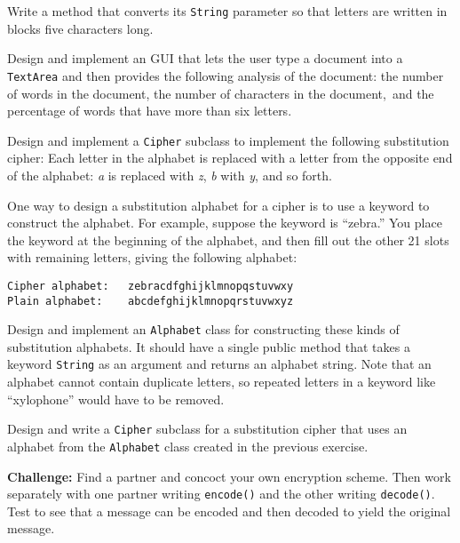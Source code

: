 \begin{EXRtwo}
\noindent Write a method that converts its {\tt String}
parameter so that letters are written in blocks five characters long.

\item  Design and implement an GUI that lets the user type a document
into a {\tt TextArea} and then provides the following analysis of the
document: the number of words in the document, the number of
characters in the document,~and the percentage of words that have more
than six letters.

\item  Design and implement a {\tt Cipher} subclass to
implement the following substitution cipher: Each letter in the alphabet
is replaced with a letter from the opposite end of the alphabet:
{\it a} is replaced with {\it z}, {\it b} with {\it y}, and so forth.

\item  One way to design a substitution alphabet for a cipher
is to use a keyword to construct the alphabet.  For example,
suppose the keyword is ``zebra.'' You place the keyword
at the beginning of the alphabet, and then fill out the
other 21 slots with remaining letters, giving the following
alphabet:

\begin{jjjlisting}
\begin{lstlisting}
Cipher alphabet:   zebracdfghijklmnopqstuvwxy
Plain alphabet:    abcdefghijklmnopqrstuvwxyz
\end{lstlisting}
\end{jjjlisting}

\noindent Design and implement an {\tt Alphabet} class for
constructing these kinds of substitution alphabets.  It should have a
single public method that takes a keyword {\tt String} as an argument
and returns an alphabet string.  Note that an alphabet cannot contain
duplicate letters, so repeated letters in a keyword like ``xylophone''
would have to be removed.

\item  Design and write a {\tt Cipher} subclass for a
substitution cipher that uses an alphabet from the {\tt Alphabet}
class created in the previous exercise.

\item  {\bf Challenge:} Find a partner and concoct your own encryption scheme.
Then work separately with one partner writing {\tt encode()} and the
other writing {\tt decode()}. Test to see that a message can be
encoded and then decoded to yield the original message.


\end{EXRtwo}
